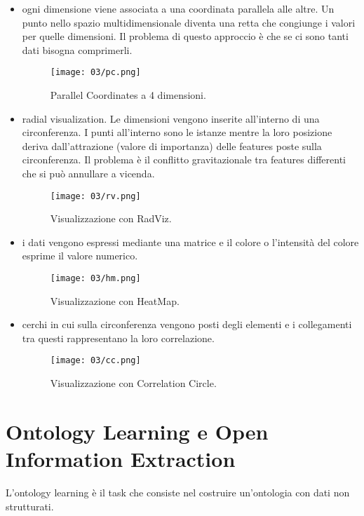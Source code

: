 \begin{itemize}
  \item {} ogni dimensione viene associata a una coordinata parallela alle altre. Un punto nello spazio multidimensionale diventa una retta che congiunge i valori per quelle dimensioni. Il problema di questo approccio è che se ci sono tanti dati bisogna comprimerli. 

\begin{figure}[h]
    \centering
    \texttt{[image: 03/pc.png]}
    \caption{Parallel Coordinates a 4 dimensioni.}
\end{figure}

\item {} radial visualization. Le dimensioni vengono inserite all'interno di una circonferenza. I punti all'interno sono le istanze mentre la loro posizione deriva dall'attrazione (valore di importanza) delle features poste sulla circonferenza. Il problema è il conflitto gravitazionale tra features differenti che si può annullare a vicenda. 
  \begin{figure}[h]
    \centering
    \texttt{[image: 03/rv.png]}
    \caption{Visualizzazione con RadViz.}
\end{figure}
\item {} i dati vengono espressi mediante una matrice e il colore o l'intensità del colore esprime il valore numerico.
\begin{figure}[h]
    \centering
    \texttt{[image: 03/hm.png]}
    \caption{Visualizzazione con HeatMap.}
\end{figure}
\item {} cerchi in cui sulla circonferenza vengono posti degli elementi e i collegamenti tra questi rappresentano la loro correlazione. 
\begin{figure}[h]
    \centering
    \texttt{[image: 03/cc.png]}
    \caption{Visualizzazione con Correlation Circle.}
\end{figure}
\end{itemize}

\section{Ontology Learning e Open Information Extraction}

L'ontology learning è il task che consiste nel costruire un'ontologia con dati non strutturati. 

